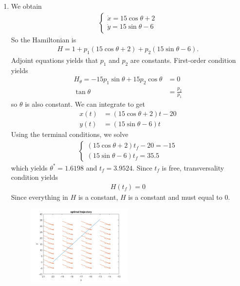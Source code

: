 \documentclass[12pt]{article}
\begin{document}
\begin{problem}[4]
\begin{enumerate}[label=(\alph*)]
\item We obtain
	\begin{align*}
		\begin{cases}
			\dot{x} = 15 \cos \theta +2\\
			\dot{y} = 15 \sin \theta -6
		\end{cases}
	\end{align*}
	So the Hamiltonian is
	\begin{align*}
		H=1+p_1(15 \cos \theta + 2) + p_2 (15 \sin \theta -6) .
	\end{align*}
	Adjoint equations yields that $ p_1$ and $ p_2$ are constants. First-order condition yields
	\begin{align*}
		H_{ \theta} = -15 p_1 \sin \theta + 15 p_2 \cos \theta &= 0 \\
		\tan \theta &= \frac{p_2}{ p_1} 
	\end{align*}
so $ \theta$ is also constant. We can integrate to get
\begin{align*}
	x(t) &= (15 \cos \theta+2) t -20\\
	y(t) &= (15 \sin \theta - 6) t  
\end{align*}
Using the terminal conditions, we solve
\begin{align*}
	\begin{cases}
		(15\cos \theta +2 )t_f -20 = -15 \\ 
		(15 \sin \theta -6)t_f = 35.5 
	\end{cases}
\end{align*}
which yields $ \theta^*  = 1.6198$ and $ t_f = 3.9524$. Since $ t_f$ is free, transversality condition yields
	 \begin{align*}
		H(t_f) =0
	\end{align*}
Since everything in $ H$ is a constant, $ H$ is a constant and must equal to $0$.
~\begin{figure}[H]
	\centering
	\includegraphics[width=0.5\textwidth]{./figures/5.4a.png}

\end{figure}
\end{enumerate}
\end{problem}
\end{document}
